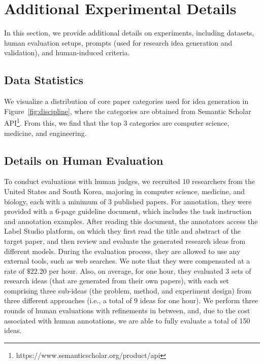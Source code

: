 \clearpage

\appendix



\section{Additional Experimental Details}
\label{appendix:setups}

In this section, we provide additional details on experiments, including datasets, human evaluation setups, prompts (used for research idea generation and validation), and human-induced criteria. 


\subsection{Data Statistics}
We visualize a distribution of core paper categories used for idea generation in Figure~\ref{fig:discipline}, where the categories are obtained from Semantic Scholar API\footnote{https://www.semanticscholar.org/product/api}. From this, we find that the top 3 categories are computer science, medicine, and engineering. 

\subsection{Details on Human Evaluation}
To conduct evaluations with human judges, we recruited 10 researchers from the United States and South Korea, majoring in computer science, medicine, and biology, each with a minimum of 3 published papers. For annotation, they were provided with a 6-page guideline document, which includes the task instruction and annotation examples. After reading this document, the annotators access the Label Studio platform, on which they first read the title and abstract of the target paper, and then review and evaluate the generated research ideas from different models. During the evaluation process, they are allowed to use any external tools, such as web searches. We note that they were compensated at a rate of $\$22.20$ per hour. Also, on average, for one hour, they evaluated 3 sets of research ideas (that are generated from their own papers), with each set comprising three sub-ideas (the problem, method, and experiment design) from three different approaches (i.e., a total of 9 ideas for one hour). We perform three rounds of human evaluations with refinements in between, and, due to the cost associated with human annotations, we are able to fully evaluate a total of 150 ideas.

